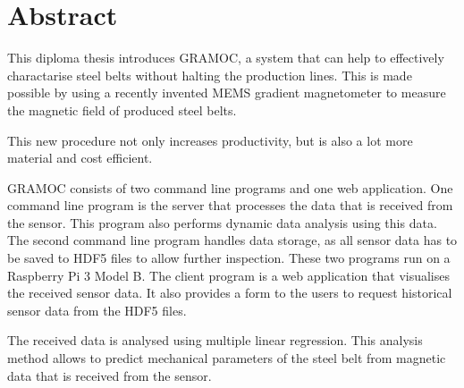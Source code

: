 \chapter{Abstract}

This diploma thesis introduces GRAMOC, a system that can help to effectively charactarise steel belts without halting the production lines. This is made possible by using a recently invented MEMS gradient magnetometer to measure the magnetic field of produced steel belts.

This new procedure not only increases productivity, but is also a lot more material and cost efficient.

GRAMOC consists of two command line programs and one web application. One command line program is the server that processes the data that is received from the sensor. This program also performs dynamic data analysis using this data. The second command line program handles data storage, as all sensor data has to be saved to HDF5 files to allow further inspection. These two programs run on a Raspberry Pi 3 Model B. The client program is a web application that visualises the received sensor data. It also provides a form to the users to request historical sensor data from the HDF5 files.

The received data is analysed using multiple linear regression. This analysis method allows to predict mechanical parameters of the steel belt from magnetic data that is received from the sensor.

